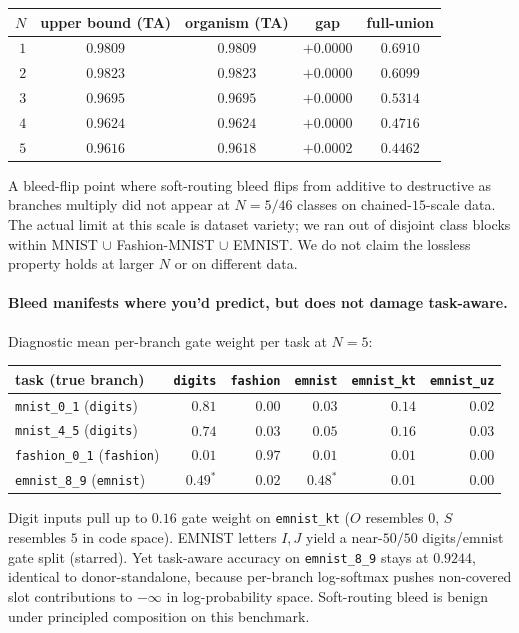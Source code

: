 \documentclass[11pt]{article}
\newcommand{\arm}[1]{\texttt{#1}}
\begin{document}
\begin{center}
\begin{tabular}{rcccc}
\toprule
$N$ & upper bound (TA) & organism (TA) & gap & full-union \\
\midrule
$1$ & $0.9809$ & $0.9809$ & $+0.0000$ & $0.6910$ \\
$2$ & $0.9823$ & $0.9823$ & $+0.0000$ & $0.6099$ \\
$3$ & $0.9695$ & $0.9695$ & $+0.0000$ & $0.5314$ \\
$4$ & $0.9624$ & $0.9624$ & $+0.0000$ & $0.4716$ \\
$5$ & $0.9616$ & $0.9618$ & $+0.0002$ & $0.4462$ \\
\bottomrule
\end{tabular}
\end{center}

A bleed-flip point where soft-routing bleed flips from additive to
destructive as branches multiply did not appear at $N = 5 / 46$
classes on chained-$15$-scale data. The actual limit at this scale is
dataset variety; we ran out of disjoint class blocks within MNIST
$\cup$ Fashion-MNIST $\cup$ EMNIST. We do not claim the lossless
property holds at larger $N$ or on different data.

\paragraph{Bleed manifests where you'd predict, but does not damage
task-aware.} Diagnostic mean per-branch gate weight per task at
$N = 5$:

\begin{center}
\begin{tabular}{lrrrrr}
\toprule
task (true branch) & \arm{digits} & \arm{fashion} & \arm{emnist} & \arm{emnist\_kt} & \arm{emnist\_uz} \\
\midrule
\texttt{mnist\_0\_1} (\arm{digits}) & $0.81$ & $0.00$ & $0.03$ & $0.14$ & $0.02$ \\
\texttt{mnist\_4\_5} (\arm{digits}) & $0.74$ & $0.03$ & $0.05$ & $0.16$ & $0.03$ \\
\texttt{fashion\_0\_1} (\arm{fashion}) & $0.01$ & $0.97$ & $0.01$ & $0.01$ & $0.00$ \\
\texttt{emnist\_8\_9} (\arm{emnist}) & $0.49^*$ & $0.02$ & $0.48^*$ & $0.01$ & $0.00$ \\
\bottomrule
\end{tabular}
\end{center}

Digit inputs pull up to $0.16$ gate weight on \arm{emnist\_kt} ($O$
resembles $0$, $S$ resembles $5$ in code space). EMNIST letters
$I, J$ yield a near-$50/50$ digits/emnist gate split (starred). Yet
task-aware accuracy on \texttt{emnist\_8\_9} stays at $0.9244$,
identical to donor-standalone, because per-branch log-softmax pushes
non-covered slot contributions to $-\infty$ in log-probability space.
Soft-routing bleed is benign under principled composition on this
benchmark.
\end{document}
